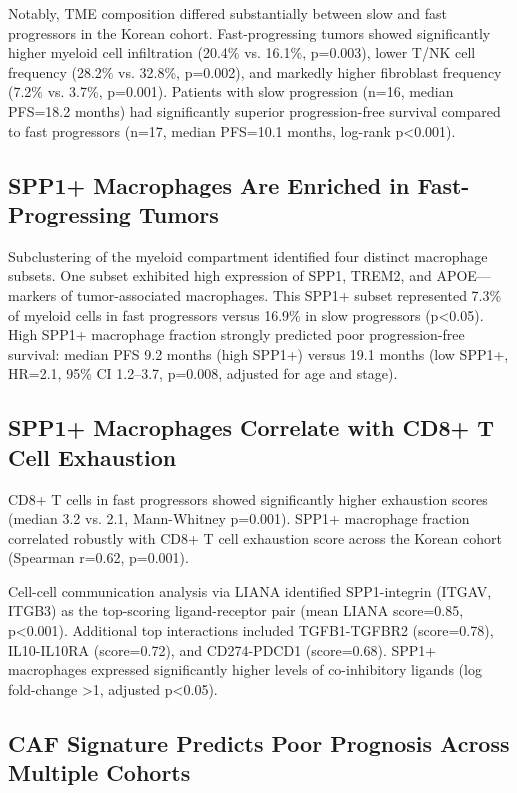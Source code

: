 \documentclass[12pt,twoside]{article}
\begin{document}
Notably, TME composition differed substantially between slow and fast progressors in the Korean cohort. Fast-progressing tumors showed significantly higher myeloid cell infiltration (20.4\% vs. 16.1\%, p=0.003), lower T/NK cell frequency (28.2\% vs. 32.8\%, p=0.002), and markedly higher fibroblast frequency (7.2\% vs. 3.7\%, p=0.001). Patients with slow progression (n=16, median PFS=18.2 months) had significantly superior progression-free survival compared to fast progressors (n=17, median PFS=10.1 months, log-rank p<0.001).

\subsection{SPP1+ Macrophages Are Enriched in Fast-Progressing Tumors}

Subclustering of the myeloid compartment identified four distinct macrophage subsets. One subset exhibited high expression of SPP1, TREM2, and APOE---markers of tumor-associated macrophages. This SPP1+ subset represented 7.3\% of myeloid cells in fast progressors versus 16.9\% in slow progressors (p<0.05). High SPP1+ macrophage fraction strongly predicted poor progression-free survival: median PFS 9.2 months (high SPP1+) versus 19.1 months (low SPP1+, HR=2.1, 95\% CI 1.2--3.7, p=0.008, adjusted for age and stage).

\subsection{SPP1+ Macrophages Correlate with CD8+ T Cell Exhaustion}

CD8+ T cells in fast progressors showed significantly higher exhaustion scores (median 3.2 vs. 2.1, Mann-Whitney p=0.001). SPP1+ macrophage fraction correlated robustly with CD8+ T cell exhaustion score across the Korean cohort (Spearman r=0.62, p=0.001).

Cell-cell communication analysis via LIANA identified SPP1-integrin (ITGAV, ITGB3) as the top-scoring ligand-receptor pair (mean LIANA score=0.85, p<0.001). Additional top interactions included TGFB1-TGFBR2 (score=0.78), IL10-IL10RA (score=0.72), and CD274-PDCD1 (score=0.68). SPP1+ macrophages expressed significantly higher levels of co-inhibitory ligands (log fold-change >1, adjusted p<0.05).

\subsection{CAF Signature Predicts Poor Prognosis Across Multiple Cohorts}
\end{document}
